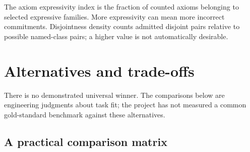 \documentclass[11pt,a4paper]{article}
\begin{document}
The axiom expressivity index is the fraction of counted axioms belonging to
selected expressive families. More expressivity can mean more incorrect
commitments. Disjointness density counts admitted disjoint pairs relative to
possible named-class pairs; a higher value is not automatically desirable.

\section{Alternatives and trade-offs}\label{sec:alternatives}

There is no demonstrated universal winner. The comparisons below are engineering
judgments about task fit; the project has not measured a common gold-standard
benchmark against these alternatives.

\subsection{A practical comparison matrix}
\end{document}
